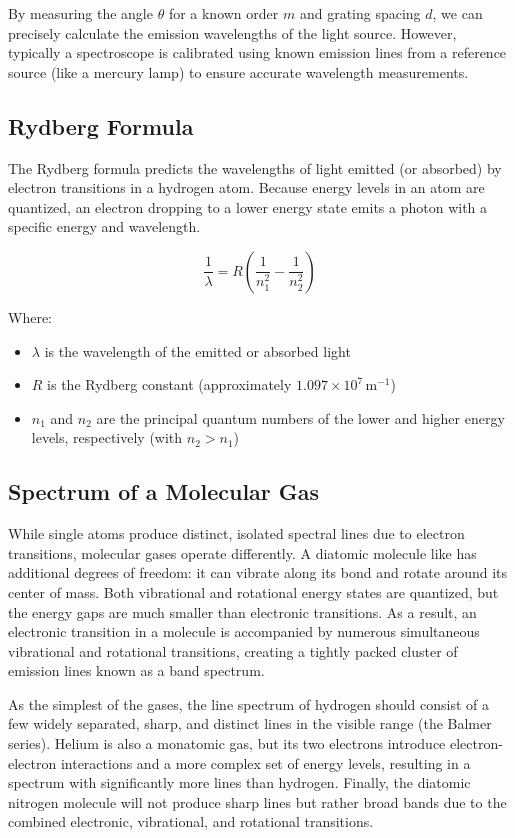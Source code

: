\documentclass[11pt]{article}
\begin{document}
    By measuring the angle $\theta$ for a known order $m$ and grating spacing $d$, we can precisely calculate the emission wavelengths of the light source. However, typically a spectroscope is calibrated using known emission lines from a reference source (like a mercury lamp) to ensure accurate wavelength measurements.

    \subsection*{Rydberg Formula}

    The Rydberg formula predicts the wavelengths of light emitted (or
    absorbed) by electron transitions in a hydrogen atom.
    Because energy levels in an atom are quantized, an electron dropping to a
    lower energy state emits a photon with a specific energy and wavelength.

    \[
        \frac{1}{\lambda} = R \left( \frac{1}{n_1^2} - \frac{1}{n_2^2} \right)
    \]

    Where:
    \begin{itemize}
        \item \( \lambda \) is the wavelength of the emitted or absorbed light
        \item \( R \) is the Rydberg constant (approximately
            \( 1.097 \times 10^7 \, \text{m}^{-1} \))
        \item \( n_1 \) and \( n_2 \) are the principal quantum numbers of the
            lower and higher energy levels, respectively (with \( n_2 > n_1 \))
    \end{itemize}

    \subsection*{Spectrum of a Molecular Gas}

    While single atoms produce distinct, isolated spectral lines due to
    electron transitions, molecular gases operate differently.
    A diatomic molecule like  has additional degrees of freedom: it can
    vibrate along its bond and rotate around its center of mass.
    Both vibrational and rotational energy states are quantized, but the
    energy gaps are much smaller than electronic transitions.
    As a result, an electronic transition in a molecule is accompanied by
    numerous simultaneous vibrational and rotational transitions, creating a
    tightly packed cluster of emission lines known as a band spectrum.

    As the simplest of the gases, the line spectrum of hydrogen should consist
    of a few widely separated, sharp, and distinct lines in the visible range
    (the Balmer series).
    Helium is also a monatomic gas, but its two electrons introduce
    electron-electron interactions and a more complex set of energy levels,
    resulting in a spectrum with significantly more lines than hydrogen.
    Finally, the diatomic nitrogen molecule will not produce sharp lines but
    rather broad bands due to the combined electronic, vibrational, and
    rotational transitions.
\end{document}
